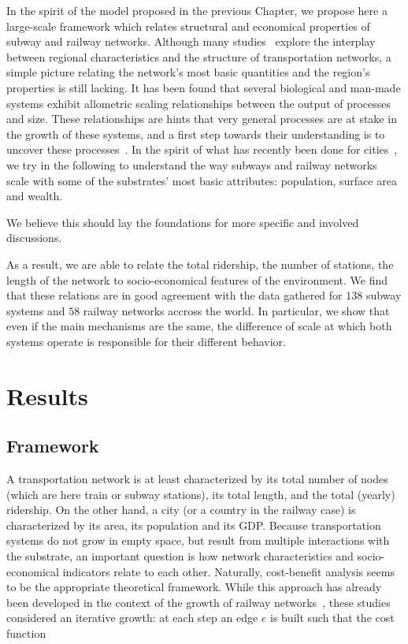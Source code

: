 In the spirit of the model proposed in the previous Chapter, we propose here a
large-scale framework which relates structural and economical properties of
subway and railway networks. Although many
studies~\cite{Kansky:1963,Derrible:2009,Levinson:2012} explore the interplay
between regional characteristics and the structure of transportation networks, a
simple picture relating the network's most basic quantities and the region's
properties is still lacking. It has been found that several biological and
man-made systems exhibit allometric scaling relationships between the output of
processes and size. These relationships are hints that very general processes
are at stake in the growth of these systems, and a first step towards their
understanding is to uncover these
processes~\cite{Banavar:1999,Louf:2014_mobility}. In
the spirit of what has recently been done for cities~\cite{Louf:2014_mobility}, we try in
the following to understand the way subways and railway networks scale with some
of the substrates' most basic attributes: population, surface area and wealth. 

We believe this should lay the foundations for more specific and involved discussions.

As a result, we are able to relate the total ridership, the number of stations,
the length of the network to socio-economical features of the environment. We
find that these relations are in good agreement with the data gathered for $138$
subway systems and $58$ railway networks accross the world. In particular, we
show that even if the main mechanisms are the same, the difference of scale at
which both systems operate is responsible for their different behavior. 


\section*{Results}

\subsection*{Framework}

A transportation network is at least characterized by its total number of nodes
(which are here train or subway stations), its total length, and the total
(yearly) ridership. On the other hand, a city (or a country in the railway case)
is characterized by its area, its population and its GDP. Because transportation
systems do not grow in empty space, but result from multiple interactions with
the substrate, an important question is how network characteristics and
socio-economical indicators relate to each other. Naturally, cost-benefit
analysis seems to be the appropriate theoretical framework. While this approach
has already been developed in the context of the growth of railway
networks~\cite{Black:1971,Louf:2013_emergence}, these studies considered an iterative
growth: at each step an edge $e$ is built such that the cost function

